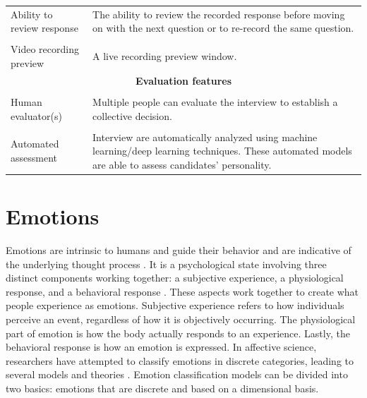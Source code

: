 \begin{table}[h!]
{\begin{tabular}{l p{9.4cm}}
     Ability to review response & The ability to review the recorded response before moving on with the next question or to re-record the same question. \\ \\ 
     Video recording preview & A live recording preview window. \\ 
     \midrule
     \multicolumn{2}{c}{\textbf{Evaluation features}} \\ \\ 
     Human evaluator(s) & Multiple people can evaluate the interview to establish a collective decision. \\ \\ 
     Automated assessment & Interview are automatically analyzed using machine learning/deep learning techniques. These automated models are able to assess candidates' personality. \\ 
     \bottomrule
    \end{tabular}
    }
    \label{tab:AVI-design-features}
\end{table}


\section{Emotions}
\label{sec:emotions}
Emotions are intrinsic to humans and guide their behavior and are indicative of the underlying thought process \cite{emotions1-minsky2007emotion}. It is a psychological state involving three distinct components working together: a subjective experience, a physiological response, and a behavioral response \cite{emotions2-LEDOUX201867}. These aspects work together to create what people experience as emotions. Subjective experience refers to how individuals perceive an event, regardless of how it is objectively occurring. The physiological part of emotion is how the body actually responds to an experience. Lastly, the behavioral response is how an emotion is expressed. In affective science, researchers have attempted to classify emotions in discrete categories, leading to several models and theories \cite{cross_cultural}. Emotion classification models can be divided into two basics: emotions that are discrete and based on a dimensional basis. \\

